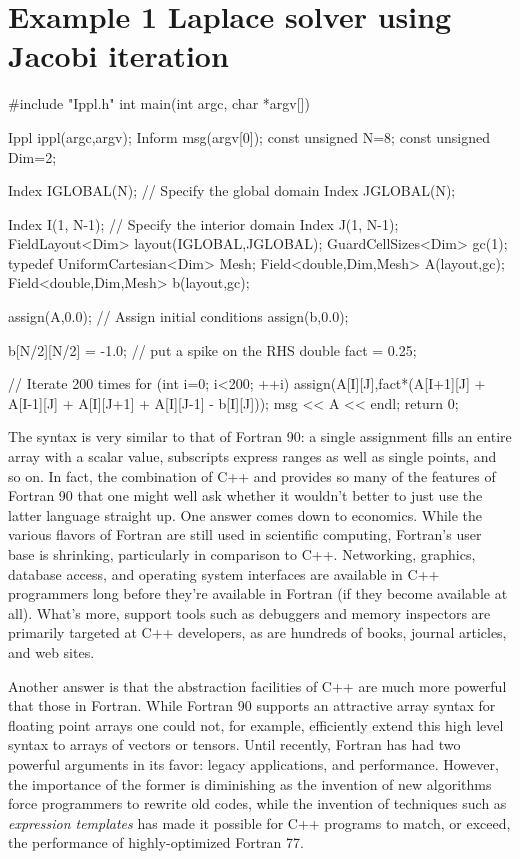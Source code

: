 \section{Example 1 Laplace solver using Jacobi iteration}
\begin{code}[caption={Laplace solver}]
#include "Ippl.h"
int main(int argc, char *argv[])
{
    Ippl ippl(argc,argv);
    Inform msg(argv[0]);
    const unsigned N=8;
    const unsigned Dim=2;

    Index IGLOBAL(N);  // Specify the global domain
    Index JGLOBAL(N);

    Index I(1, N-1); // Specify the interior domain
    Index J(1, N-1);
    FieldLayout<Dim> layout(IGLOBAL,JGLOBAL);
    GuardCellSizes<Dim> gc(1);
    typedef UniformCartesian<Dim> Mesh;
    Field<double,Dim,Mesh> A(layout,gc);
    Field<double,Dim,Mesh> b(layout,gc);

    assign(A,0.0);  // Assign initial conditions
    assign(b,0.0);

    b[N/2][N/2] = -1.0;  // put a spike on the RHS
    double fact = 0.25;

    // Iterate 200 times
    for (int i=0; i<200; ++i) {
        assign(A[I][J],fact*(A[I+1][J] +
                             A[I-1][J] +
                             A[I][J+1] +
                             A[I][J-1] - b[I][J]));
    }
    msg << A << endl;
    return 0;
}
\end{code}
The syntax is very similar to that of Fortran 90: a single assignment fills an entire array with a scalar value, subscripts express ranges as well as single points, and so on. In fact, the combination of C++ and \ippl provides so many of the features of Fortran 90 that one might well ask whether it wouldn't better to just use the latter language straight up. One answer comes down to economics. While the various flavors of Fortran are still used in scientific computing, Fortran's user base is shrinking, particularly in comparison to C++. Networking, graphics, database access, and operating system interfaces are available in C++ programmers long before they're available in Fortran (if they become available at all). What's more, support tools such as debuggers and memory inspectors are primarily targeted at C++ developers, as are hundreds of books, journal articles, and web sites.

Another answer is that the abstraction facilities of C++ are much more powerful that those in Fortran. While Fortran 90 supports an attractive array syntax for floating point arrays one could not, for example, efficiently extend this high level syntax to arrays of vectors or tensors. Until recently, Fortran has had two powerful arguments in its favor: legacy applications, and performance. However, the importance of the former is diminishing as the invention of new algorithms force programmers to rewrite old codes, while the invention of techniques such as {\it expression templates} has made it possible for C++ programs to match, or exceed, the performance of highly-optimized Fortran 77.


